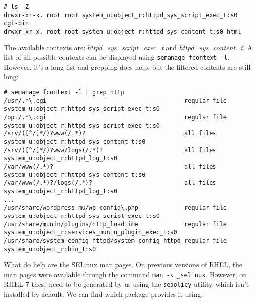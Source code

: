 \vspace{-15pt}
\begin{verbatim}
# ls -Z
drwxr-xr-x. root root system_u:object_r:httpd_sys_script_exec_t:s0 cgi-bin
drwxr-xr-x. root root system_u:object_r:httpd_sys_content_t:s0 html
\end{verbatim}
\vspace{-10pt}

\noindent
The available contexts are: \textit{httpd\_sys\_script\_exec\_t} and \textit{httpd\_sys\_content\_t}. A list of all possible contexts can be displayed using \verb|semanage fcontext -l|. However, it's a long list and grepping does help, but the filtered contents are still long:

\vspace{-15pt}
\begin{verbatim}
# semanage fcontext -l | grep http
/usr/.*\.cgi                                       regular file       system_u:object_r:httpd_sys_script_exec_t:s0 
/opt/.*\.cgi                                       regular file       system_u:object_r:httpd_sys_script_exec_t:s0 
/srv/([^/]*/)?www(/.*)?                            all files          system_u:object_r:httpd_sys_content_t:s0 
/srv/([^/]*/)?www/logs(/.*)?                       all files          system_u:object_r:httpd_log_t:s0 
/var/www(/.*)?                                     all files          system_u:object_r:httpd_sys_content_t:s0 
/var/www(/.*)?/logs(/.*)?                          all files          system_u:object_r:httpd_log_t:s0 
...
/usr/share/wordpress-mu/wp-config\.php             regular file       system_u:object_r:httpd_sys_script_exec_t:s0 
/usr/share/munin/plugins/http_loadtime             regular file       system_u:object_r:services_munin_plugin_exec_t:s0 
/usr/share/system-config-httpd/system-config-httpd regular file       system_u:object_r:bin_t:s0 
\end{verbatim}
\vspace{-10pt}

\noindent
What do help are the SELinux man pages. On previous versions of RHEL, the man pages were available through the command \verb|man -k _selinux|. However, on RHEL 7 these need to be generated by us using the \verb|sepolicy| utility, which isn't installed by default. We can find which package provides it using:

